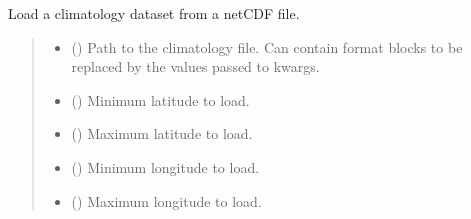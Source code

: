 \documentclass[letterpaper,10pt,english]{sphinxmanual}
\begin{document}
\begin{fulllineitems}
\label{\detokenize{misc:glomar_gridding.climatology.read_climatology}}
\pysigstartsignatures
\pysiglinewithargsret
{}
{\sphinxparamcomma {}\sphinxparamcomma {}\sphinxparamcomma {}\sphinxparamcomma {}\sphinxparamcomma {}\sphinxparamcomma {}\sphinxparamcomma {}}
{}
\pysigstopsignatures
\sphinxAtStartPar
Load a climatology dataset from a netCDF file.
\begin{quote}\begin{description}
\begin{itemize}
\item {}
\sphinxAtStartPar
{} () \textendash{} Path to the climatology file. Can contain format blocks to be replaced
by the values passed to kwargs.

\item {}
\sphinxAtStartPar
{} () \textendash{} Minimum latitude to load.

\item {}
\sphinxAtStartPar
{} () \textendash{} Maximum latitude to load.

\item {}
\sphinxAtStartPar
{} () \textendash{} Minimum longitude to load.

\item {}
\sphinxAtStartPar
{} () \textendash{} Maximum longitude to load.


\end{itemize}
\end{description}
\end{quote}
\end{fulllineitems}
\end{document}
